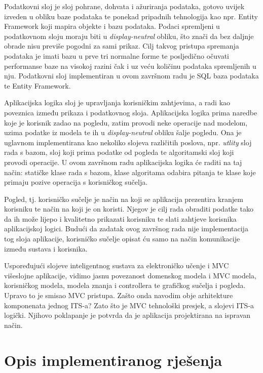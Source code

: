\documentclass[times, utf8, zavrsni, numeric]{fer}
\begin{document}
\par
Podatkovni sloj je sloj pohrane, dohvata i ažuriranja podataka, gotovo uvijek izveden u obliku baze podataka te ponekad pripadnih tehnologija kao npr. Entity Framework koji mapira objekte i bazu podataka. Podaci spremljeni u podatkovnom sloju moraju biti u \textit{display-neutral} obliku, što znači da bez daljnje obrade nisu previše pogodni za sami prikaz. Cilj takvog pristupa spremanja podataka je imati bazu u prve tri normalne forme te posljedično očuvati performanse baze na visokoj razini čak i uz veću količinu podataka spremljenih u nju. Podatkovni sloj implementiran u ovom završnom radu je SQL baza podataka te Entity Framework.
\par
Aplikacijska logika sloj je upravljanja korisničkim zahtjevima, a radi kao poveznica između prikaza i podatkovnog sloja. Aplikacijska logika prima naredbe koje je korisnik zadao na pogledu, zatim provodi neke operacije nad modelom, uzima podatke iz modela te ih u \textit{display-neutral} obliku šalje pogledu. Ona je uglavnom implementirana kao nekoliko slojeva različitih poslova, npr. \textit{utlity} sloj rada s bazom, sloj koji prima podatke od pogleda te algoritamski sloj koji provodi operacije. U ovom završnom radu aplikacijska logika će raditi na taj način: statičke klase rada s bazom, klase algoritama odabira pitanja te klase koje primaju pozive operacija s korisničkog sučelja.
\par
Pogled, tj. korisničko sučelje je način na koji se aplikacija prezentira kranjem korisniku te način na koji je on koristi. Njegov je cilj rada obraditi podatke tako da ih može lijepo i kvalitetno prikazati korisniku te slati zahtjeve korisnika aplikacijskoj logici. Budući da zadatak ovog završnog rada nije implementacija tog sloja aplikacije, korisničko sučelje opisat ću samo na način komunikacije između sustava i korisnika.
\par
Uspoređujući slojeve inteligentnog sustava za elektroničko učenje i MVC višeslojne aplikacije, vidimo jasnu povezanost domenskog modela i MVC modela, korisničkog modela, modela znanja i controllera te grafičkog sučelja i pogleda. Upravo to je smisao MVC pristupa. Zašto onda navodim obje arhitekture komponenata jednog ITS-a? Zato što je MVC tehnološki presjek, a slojevi ITS-a logički. Njihovo poklapanje je potvrda da je aplikacija projektirana na ispravan način.

\chapter{Opis implementiranog rješenja}
\end{document}
